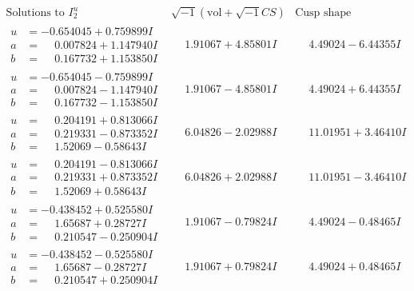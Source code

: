 \documentclass[1p]{elsarticle_modified}
\theoremstyle{definition}
\newcommand{\I}{\sqrt{-1}}
\begin{document}
$$\begin{array}{c|c|c}  
\text{Solutions to }I^u_{2}& \I (\text{vol} + \sqrt{-1}CS) & \text{Cusp shape}\\
 \hline 
\begin{aligned}
u &= -0.654045 + 0.759899 I \\
a &= \phantom{-}0.007824 + 1.147940 I \\
b &= \phantom{-}0.167732 + 1.153850 I\end{aligned}
 & \phantom{-}1.91067 + 4.85801 I & \phantom{-}4.49024 - 6.44355 I \\ \hline\begin{aligned}
u &= -0.654045 - 0.759899 I \\
a &= \phantom{-}0.007824 - 1.147940 I \\
b &= \phantom{-}0.167732 - 1.153850 I\end{aligned}
 & \phantom{-}1.91067 - 4.85801 I & \phantom{-}4.49024 + 6.44355 I \\ \hline\begin{aligned}
u &= \phantom{-}0.204191 + 0.813066 I \\
a &= \phantom{-}0.219331 - 0.873352 I \\
b &= \phantom{-}1.52069 - 0.58643 I\end{aligned}
 & \phantom{-}6.04826 - 2.02988 I & \phantom{-}11.01951 + 3.46410 I \\ \hline\begin{aligned}
u &= \phantom{-}0.204191 - 0.813066 I \\
a &= \phantom{-}0.219331 + 0.873352 I \\
b &= \phantom{-}1.52069 + 0.58643 I\end{aligned}
 & \phantom{-}6.04826 + 2.02988 I & \phantom{-}11.01951 - 3.46410 I \\ \hline\begin{aligned}
u &= -0.438452 + 0.525580 I \\
a &= \phantom{-}1.65687 + 0.28727 I \\
b &= \phantom{-}0.210547 - 0.250904 I\end{aligned}
 & \phantom{-}1.91067 - 0.79824 I & \phantom{-}4.49024 - 0.48465 I \\ \hline\begin{aligned}
u &= -0.438452 - 0.525580 I \\
a &= \phantom{-}1.65687 - 0.28727 I \\
b &= \phantom{-}0.210547 + 0.250904 I\end{aligned}
 & \phantom{-}1.91067 + 0.79824 I & \phantom{-}4.49024 + 0.48465 I \\ \hline\begin{aligned}

\end{aligned}
\end{array}$$
\end{document}
